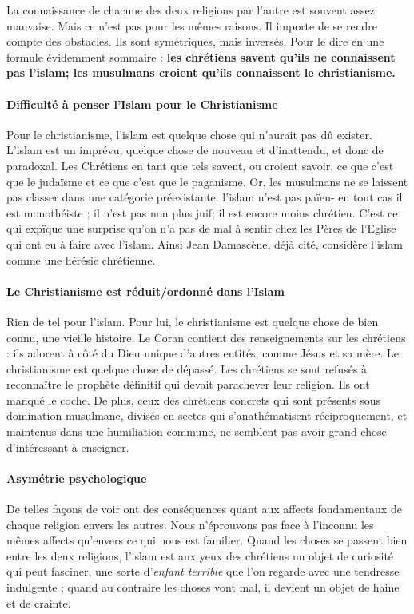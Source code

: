 La connaissance de chacune des deux religions par l'autre est souvent assez mauvaise. Mais ce n'est pas pour les mêmes raisons. Il importe de se rendre compte des obstacles. Ils sont symétriques, mais inversés. Pour le dire en une formule évidemment sommaire : \textbf{les chrétiens savent qu'ils ne connaissent pas l'islam; les musulmans croient qu'ils connaissent le christianisme.}

\paragraph{Difficulté à penser l'Islam pour le Christianisme}
Pour le christianisme, l'islam est quelque chose qui n'aurait pas dû exister. L'islam est un imprévu, quelque chose de nouveau et d'inattendu, et donc de paradoxal. Les Chrétiens en tant que tels savent, ou croient savoir, ce que c'est que le judaïsme et ce que c'est que le paganisme. Or, les musulmans ne se laissent pas classer dans une catégorie préexistante: l'islam n'est pas païen- en tout cas il est monothéiste ; il n'est pas non plus juif; il est encore moins chrétien. C'est ce qui expïque une surprise qu'on n'a pas de mal à sentir chez les Pères de l'Eglise qui ont eu à faire avec l'islam. Ainsi Jean Damascène, déjà cité, considère l'islam comme une hérésie chrétienne.

\paragraph{Le Christianisme est réduit/ordonné dans l'Islam}
Rien de tel pour l'islam. Pour lui, le christianisme est quelque chose de bien connu, une vieille histoire. Le Coran contient des renseignements sur les chrétiens : ils adorent à côté du Dieu unique d'autres entités, comme Jésus et sa mère. Le christianisme est quelque chose de dépassé. Les chrétiens se sont refusés à reconnaître le prophète définitif qui devait parachever leur religion. Ils ont manqué le coche. De plus, ceux des chrétiens concrets qui sont présents sous domination musulmane, divisés en sectes qui s'anathématisent réciproquement, et maintenus dans une humiliation commune, ne semblent pas avoir grand-chose d'intéressant à enseigner.

\paragraph{Asymétrie psychologique}
De telles façons de voir ont des conséquences quant aux affects fondamentaux de chaque religion envers les autres. Nous n'éprouvons pas face à l'inconnu les mêmes affects qu'envers ce qui nous est familier. Quand les choses se passent bien entre les deux religions, l'islam est aux yeux des chrétiens un objet de curiosité qui peut fasciner, une sorte d'\textit{enfant terrible} que l'on regarde avec une tendresse indulgente ; quand au contraire les choses vont mal, il devient un objet de haine et de crainte.

